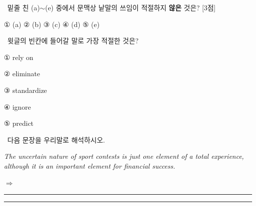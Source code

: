 \documentclass[11pt,a4paper]{article}
\newcommand{\qno}[1]{\par\vspace{8pt}\noindent{\sffamily\bfseries #1.}\ }
\newcommand{\instr}[1]{{\sffamily #1}\par\vspace{3pt}}
\begin{document}
\qno{2}\instr{밑줄 친 (a)$\sim$(e) 중에서 문맥상 낱말의 쓰임이 적절하지 \textbf{않은} 것은? [3점]}
\begin{choices}
\item ① (a) \quad ② (b) \quad ③ (c) \quad ④ (d) \quad ⑤ (e)
\end{choices}

\qno{3}\instr{윗글의 빈칸에 들어갈 말로 가장 적절한 것은?}
\begin{choices}
\item ① rely on
\item ② eliminate
\item ③ standardize
\item ④ ignore
\item ⑤ predict
\end{choices}

\qno{4}\instr{[서술형] 다음 문장을 우리말로 해석하시오.}
\vspace{4pt}\par\noindent
\hspace{1em}\textit{The uncertain nature of sport contests is just one element of a total experience, although it is an important element for financial success.}
\par\vspace{6pt}\noindent
$\Rightarrow$ \rule{\linewidth}{0.4pt}
\par\vspace{8pt}\noindent
\rule{\linewidth}{0.4pt}
\end{document}
